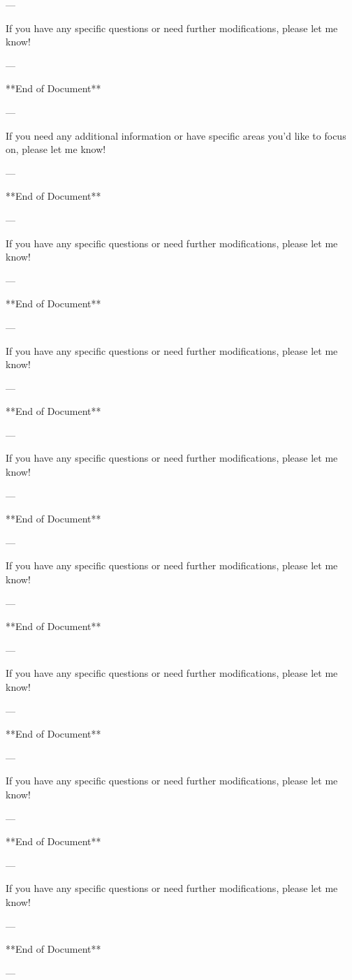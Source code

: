 ---

If you have any specific questions or need further modifications, please let me know! 

--- 

**End of Document** 

--- 

If you need any additional information or have specific areas you'd like to focus on, please let me know! 

--- 

**End of Document** 

--- 

If you have any specific questions or need further modifications, please let me know! 

--- 

**End of Document** 

--- 

If you have any specific questions or need further modifications, please let me know! 

--- 

**End of Document** 

--- 

If you have any specific questions or need further modifications, please let me know! 

--- 

**End of Document** 

--- 

If you have any specific questions or need further modifications, please let me know! 

--- 

**End of Document** 

--- 

If you have any specific questions or need further modifications, please let me know! 

--- 

**End of Document** 

--- 

If you have any specific questions or need further modifications, please let me know! 

--- 

**End of Document** 

--- 

If you have any specific questions or need further modifications, please let me know! 

--- 

**End of Document** 

--- 

